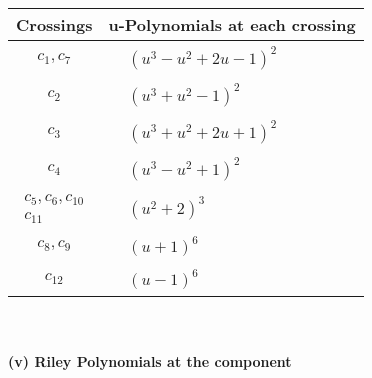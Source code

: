 \documentclass[1p]{elsarticle_modified}
\theoremstyle{definition}
\begin{document}
\begin{tabular}{m{50pt}|m{274pt}}
Crossings & \hspace{64pt}u-Polynomials at each crossing \\
\hline $$\begin{aligned}c_{1},c_{7}\end{aligned}$$&$\begin{aligned}
&(u^3- u^2+2 u-1)^2
\end{aligned}$\\
\hline $$\begin{aligned}c_{2}\end{aligned}$$&$\begin{aligned}
&(u^3+u^2-1)^2
\end{aligned}$\\
\hline $$\begin{aligned}c_{3}\end{aligned}$$&$\begin{aligned}
&(u^3+u^2+2 u+1)^2
\end{aligned}$\\
\hline $$\begin{aligned}c_{4}\end{aligned}$$&$\begin{aligned}
&(u^3- u^2+1)^2
\end{aligned}$\\
\hline $$\begin{aligned}c_{5},c_{6},c_{10}\\c_{11}\end{aligned}$$&$\begin{aligned}
&(u^2+2)^3
\end{aligned}$\\
\hline $$\begin{aligned}c_{8},c_{9}\end{aligned}$$&$\begin{aligned}
&(u+1)^6
\end{aligned}$\\
\hline $$\begin{aligned}c_{12}\end{aligned}$$&$\begin{aligned}
&(u-1)^6
\end{aligned}$\\
\hline
\end{tabular}\\~\\
\newpage\renewcommand{\arraystretch}{1}
\flushleft \textbf{(v) Riley Polynomials at the component}\newline \\
\end{document}
